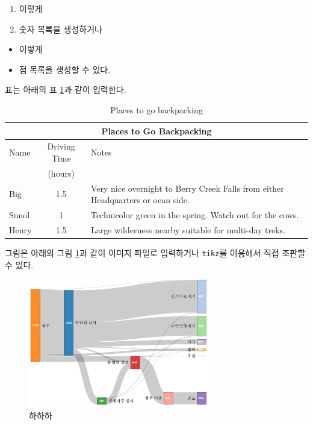 \documentclass[11pt]{article}           %
\begin{document}
\begin{enumerate}
    \item 이렇게
    \item 숫자 목록을 생성하거나
\end{enumerate}

\begin{itemize}
   \item 이렇게
   \item 점 목록을 생성할 수 있다.
\end{itemize}

표는 아래의 표 \ref{tab:backpacking}과 같이 입력한다.

\begin{table}
\centering
    \begin{tabular}{|l|c|p{3.5in}|}
    \hline
    \multicolumn{3}{|c|}{Places to Go Backpacking}\\ \hline
    Name    & Driving Time  & Notes\\
            & (hours)       & \\ \hline
    Big     & 1.5           & Very nice overnight to Berry Creek Falls from
    either Headquarters or oean side.\\ \hline
    Sunol   & 1             & Technicolor green in the spring. Watch out for the cows.\\ \hline
    Henry   & 1.5           & Large wilderness nearby suitable for multi-day treks.\\ \hline
    \end{tabular}
    \caption{Places to go backpacking}
    \label{tab:backpacking}
\end{table}

그림은 아래의 그림 \ref{fig:sankey}과 같이 이미지 파일로 입력하거나 
\verb+tikz+를 이용해서  직접 조판할 수 있다.

\begin{figure}[t]
    \centering
    \includegraphics[width=0.7\textwidth]{sankey.png}
    \caption{하하하}
    \label{fig:sankey}
\end{figure}
\end{document}

